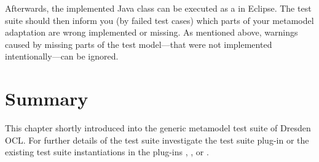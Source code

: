 Afterwards, the implemented Java class can be executed as a  in Eclipse. The test suite should then inform you (by failed test 
cases) which parts of your metamodel adaptation are wrong implemented or
missing. As mentioned above, warnings caused by missing parts of the test 
model---that were not implemented intentionally---can be ignored.


\section{Summary}

This chapter shortly introduced into the generic metamodel test suite of 
Dresden OCL. For further details of the test suite investigate the test suite
plug-in
 or
the existing test suite instantiations in the plug-ins , 
, or 
.
